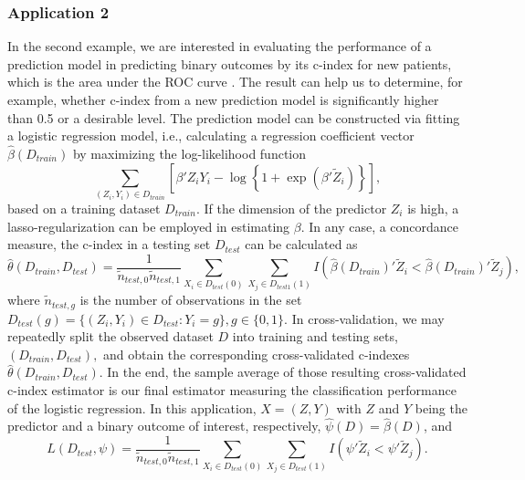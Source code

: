 \documentclass[12pt]{article}
\begin{document}
\subsubsection{Application 2} \label{sec:application2}
In the second example, we are interested in evaluating the performance of a prediction model in predicting binary outcomes by its c-index for new patients, which is the area under the ROC curve \cite{faraggi2002estimation, pepe2003statistical}. The result can help us to determine, for example, whether c-index from a new prediction model is significantly higher than 0.5 or a desirable level. The prediction model can be constructed via fitting a logistic regression model, i.e., calculating a regression coefficient vector $\hat{\beta}(D_{train})$ by maximizing the log-likelihood function
$$ \sum_{(
Z_i,Y_i)\in D_{train} } \left[ \beta'Z_i Y_i-\log\left\{1+\exp(\beta'\tilde{Z}_i)  \right\}\right],$$
based on a training dataset $D_{train}$. If the dimension of the predictor $Z_i$ is high, a lasso-regularization can be employed in estimating $\beta$.  In any case, a concordance measure, the c-index in a testing set $D_{test}$ can be calculated as 
$$\hat{\theta}(D_{train}, D_{test})=\frac{1}{\tilde{n}_{test, 0}\tilde{n}_{test, 1}}\sum_{X_i \in D_{test}(0)}\sum_{X_j\in D_{test1}(1)}I\left(\hat{\beta}(D_{train})'\tilde{Z}_i<\hat{\beta}(D_{train})'\tilde{Z}_j \right),$$
where $\tilde{n}_{test,g}$ is the number of observations in the set $D_{test}(g)=\{(Z_i,Y_i)\in D_{test}: Y_i=g\}, g\in \{0, 1\}.$
In cross-validation, we may repeatedly split the observed dataset $D$ into training and testing sets, $(D_{train}, D_{test}),$ and obtain the corresponding cross-validated c-indexes $\hat{\theta}(D_{train}, D_{test})$.  In the end, the sample average of those resulting cross-validated c-index estimator is our final estimator measuring the classification performance of the logistic regression. In this application, $X=(Z, Y)$ with $Z$ and $Y$ being the predictor and a binary outcome of interest, respectively, $\hat{\psi}(D)=\hat{\beta}(D)$, and 
$$L\left(D_{test}, \psi\right)=\frac{1}{\tilde{n}_{test, 0}\tilde{n}_{test, 1}}\sum_{X_i\in D_{test}(0)}\sum_{X_j\in D_{test}(1)} I\left(\psi'\tilde{Z}_i<\psi'\tilde{Z}_j \right).$$
\end{document}
